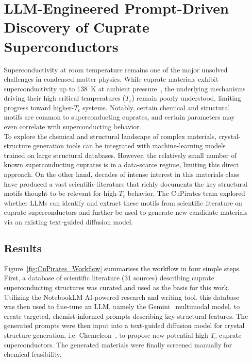 \section{LLM-Engineered Prompt-Driven Discovery of Cuprate Superconductors}
Superconductivity at room temperature remains one of the major unsolved challenges in condensed matter physics. While cuprate materials exhibit superconductivity up to \SI{138}{\kelvin} at ambient pressure~\cite{dai_synthesis_1995}, the underlying mechanisms driving their high critical temperatures ($T_c$) remain poorly understood, limiting progress toward higher-$T_c$ systems. Notably, certain chemical and structural motifs are common to superconducting cuprates, and certain parameters may even correlate with superconducting behavior. \\

\noindent To explore the chemical and structural landscape of complex materials, crystal-structure generation tools can be integrated with machine-learning models trained on large structural databases. However, the relatively small number of known superconducting cuprates is in a data-scarce regime, limiting this direct approach. On the other hand, decades of intense interest in this materials class have produced a vast scientific literature that richly documents the key structural motifs thought to be relevant for high-$T_c$ behavior. The CuPirates team explored whether LLMs can identify and extract these motifs from scientific literature on cuprate superconductors and further be used to generate new candidate materials via an existing text-guided diffusion model. 

\subsection*{Results}
Figure~\ref{fig:CuPirates_Workflow} summarises the workflow in four simple steps. First, a database of scientific literature (31 sources) describing cuprate superconducting structures was curated and used as the basis for this work. Utilizing the NotebookLM AI-powered research and writing tool, this database was then used to fine-tune an LLM, namely the Gemini~\cite{Gemini} multimodal model, to create targeted, chemist-informed prompts describing key structural features. The generated prompts were then input into a text-guided diffusion model for crystal structure generation, i.e. Chemeleon~\cite{ParkNC25_Chemeleon}, to propose new potential high-$T_c$ cuprate superconductors. The generated materials were finally screened manually for chemical feasibility.

